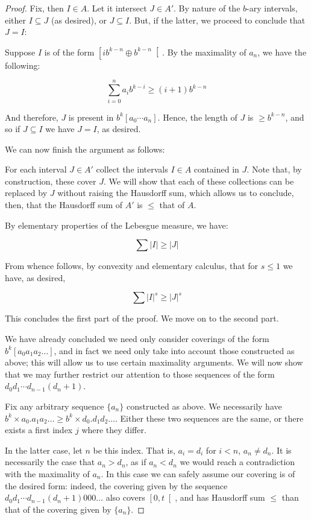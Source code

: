\documentclass[11pt, reqno]{amsart}
\begin{document}
\begin{proof}
Fix, then $I \in A$. Let it intersect $J \in A'$. By nature of the $b$-ary intervals, either $I \subseteq J$ (as desired), or $J \subseteq I$. But, if the latter, we proceed to conclude that $J = I$:

Suppose $I$ is of the form $\left[ i b^{k-n} \oplus b^{k-n} \right[$. By the maximality of $a_n$, we have the following:

\[ \sum_{i = 0}^n a_i b^{k-i} \geq (i+1) b^{k-n} \]

And therefore, $J$ is present in $b^k [a_0 \cdots a_n]$. Hence, the length of $J$ is $\geq b^{k-n}$, and so if $J \subseteq I$ we have $J = I$, as desired.

We can now finish the argument as follows:

For each interval $J \in A'$ collect the intervals $I \in A$ contained in $J$. Note that, by construction, these cover $J$. We will show that each of these collections can be replaced by $J$ without raising the Hausdorff sum, which allows us to conclude, then, that the Hausdorff sum of $A'$ is $\leq$ that of $A$.

By elementary properties of the Lebesgue measure, we have:

\[ \sum \lvert I \rvert \geq \lvert J \rvert \]

From whence follows, by convexity and elementary calculus, that for $s \leq 1$ we have, as desired,

\[ \sum \lvert I \rvert^s \geq \lvert J \rvert^s \]

This concludes the first part of the proof. We move on to the second part.

We have already concluded we need only consider coverings of the form $b^k [a_0 a_1 a_2 \dots]$, and in fact we need only take into account those constructed as above; this will allow us to use certain maximality arguments. We will now show that we may further restrict our attention to those sequences of the form $d_0 d_1 \cdots d_{n-1} (d_n + 1)$.

Fix any arbitrary sequence $\{a_n\}$ constructed as above. We necessarily have $b^k \times a_0 . a_1 a_2 \dots \geq b^k \times d_0 . d_1 d_2 \dots$. Either these two sequences are the same, or there exists a first index $j$ where they differ.

In the latter case, let $n$ be this index. That is, $a_i = d_i$ for $i < n$, $a_n \neq d_n$. It is necessarily the case that $a_n > d_n$, as if $a_n < d_n$ we would reach a contradiction with the maximality of $a_n$. In this case we can safely assume our covering is of the desired form: indeed, the covering given by the sequence $d_0 d_1 \cdots d_{n-1} (d_n + 1) 0 0 0 \dots$ also covers $\left[0, t \right[$, and has Hausdorff sum $\leq$ than that of the covering given by $\{a_n\}$.


\end{proof}
\end{document}
